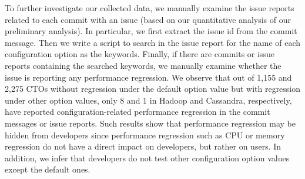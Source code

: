 To further investigate our collected data, we manually examine the issue reports related to each commit with an \inconsistent issue (based on our quantitative analysis of our preliminary analysis). In particular, we first extract the issue id from the commit message. Then we write a script to search in the issue report for the name of each configuration option as the keywords. Finally, if there are commits or issue reports containing the searched keywords, we manually examine whether the issue is reporting any performance regression.
We observe that out of 1,155 and 2,275 CTOs without regression under the default option value but with regression under other option values, only 8 and 1 \instance in Hadoop and Cassandra, respectively, have  reported configuration-related performance regression in the commit messages or issue reports. Such results show that performance regression may be hidden from developers since performance regression such as CPU or memory regression do not have a direct impact on developers, but rather on users. In addition, we infer that developers do not test other configuration option values except the default ones.
